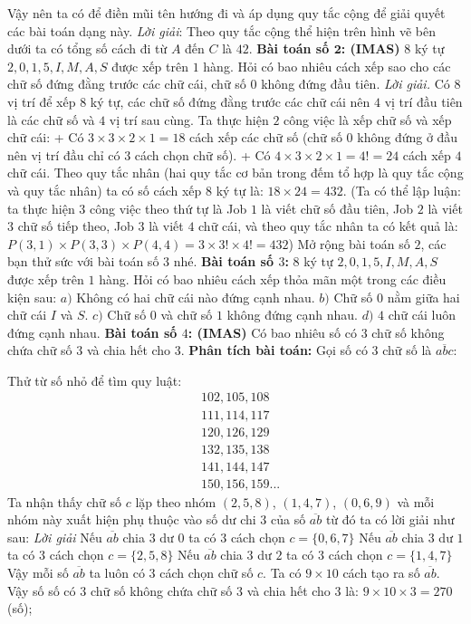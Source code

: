 	\vskip 0.1cm
	Vậy nên ta có để điền mũi tên hướng đi và áp dụng quy tắc cộng để giải quyết các bài toán dạng này.
	\vskip 0.1cm
	\textit{Lời giải}: Theo quy tắc cộng thể hiện trên hình vẽ bên dưới ta có tổng số cách đi từ $A$ đến $C$ là $42$.
	\vskip 0.1cm
\textbf{\color{toancuabi}Bài toán số $\pmb2$: (IMAS)}
\vskip 0.1cm
$8$ ký tự $2,0,1,5,I,M,A,S$ được xếp trên $1$ hàng. Hỏi có bao nhiêu cách xếp sao cho các chữ số đứng đằng trước các chữ cái, chữ số $0$ không đứng đầu tiên.
\vskip 0.1cm
\textit{Lời giải.}
Có $8$ vị trí để xếp $8$ ký tự, các chữ số đứng đằng trước các chữ cái nên $4$ vị trí đầu tiên là các chữ số và $4$ vị trí sau cùng. Ta thực hiện $2$ công việc là xếp chữ số và xếp chữ cái:
\vskip 0.1cm
+ Có $3\times3\times2\times1=18$ cách xếp các chữ số (chữ số $0$ không đứng ở đầu nên vị trí đầu chỉ có $3$ cách chọn chữ số).
\vskip 0.1cm
+ Có $4\times3\times2\times1=4!=24$ cách xếp $4$ chữ cái.
\vskip 0.1cm
Theo quy tắc nhân (hai quy tắc cơ bản trong đếm tổ hợp là quy tắc cộng và quy tắc nhân) ta có số cách xếp $8$ ký tự là: $18\times24=432$.
\vskip 0.1cm
(Ta có thể lập luận: ta thực hiện $3$ công việc theo thứ tự là Job $1$ là viết chữ số đầu tiên, Job $2$ là viết $3$ chữ số tiếp theo, Job $3$ là viết $4$ chữ cái, và theo quy tắc nhân ta có kết quả là: $P(3,1)\times P(3,3)\times P(4,4)=3\times3!\times4!=432$)
\vskip 0.1cm
Mở rộng bài toán số $2$, các bạn thử sức với bài toán số $3$ nhé.
\vskip 0.1cm
\textbf{\color{toancuabi}Bài toán số $3$:}
\vskip 0.1cm
$8$ ký tự $2,0,1,5,I,M,A,S$ được xếp trên $1$ hàng. Hỏi có bao nhiêu cách xếp thỏa mãn một trong các điều kiện sau:
\vskip 0.1cm
$a)$ Không có hai chữ cái nào đứng cạnh nhau.
\vskip 0.1cm
$b)$ Chữ số $0$ nằm giữa hai chữ cái $I$ và $S$.
\vskip 0.1cm
$c)$ Chữ số $0$ và chữ số $1$ không đứng cạnh nhau.
\vskip 0.1cm
$d)$ $4$ chữ cái luôn đứng cạnh nhau.
\vskip 0.1cm
\textbf{\color{toancuabi}Bài toán số $4$: (IMAS)}
\vskip 0.1cm
Có bao nhiêu số có $3$ chữ số không chứa chữ số $3$ và chia hết cho $3$.
\vskip 0.1cm
\textbf{\color{toancuabi}Phân tích bài toán:}
\vskip 0.1cm
Gọi số có $3$ chữ số là $\overline{abc}$:
\begin{multicols}{2}
	Thử từ số nhỏ để tìm quy luật:
	\begin{align*}
		&102, 105, 108\\
		&111, 114, 117\\
		&120, 126, 129\\
		&132, 135, 138\\
		&141, 144, 147\\
		&150, 156, 159...
	\end{align*}
	Ta nhận thấy chữ số $c$ lặp theo nhóm $(2,5,8)$, $(1,4,7)$, $(0,6,9)$ và mỗi nhóm này xuất hiện phụ thuộc vào số dư chi $3$ của số $\overline{ab}$ từ đó ta có lời giải như sau:
\vskip 0.1cm
\textit{Lời giải}
\vskip 0.1cm
Nếu $\overline{ab}$ chia $3$ dư $0$ ta có $3$ cách chọn $c=\{0,6,7\}$
\vskip 0.1cm
Nếu $\overline{ab}$ chia $3$ dư $1$ ta có $3$ cách chọn $c=\{2,5,8\}$
\vskip 0.1cm
Nếu $\overline{ab}$ chia $3$ dư $2$ ta có $3$ cách chọn $c=\{1,4,7\}$
\vskip 0.1cm
Vậy mỗi số $\overline{ab}$ ta luôn có $3$ cách chọn chữ số $c$.
\vskip 0.1cm
Ta có $9\times 10$ cách tạo ra số $\overline{ab}$.
\vskip 0.1cm
Vậy số số có $3$ chữ số không chứa chữ số $3$ và chia hết cho $3$ là: $9\times10\times3=270$ (số);
\end{multicols}
